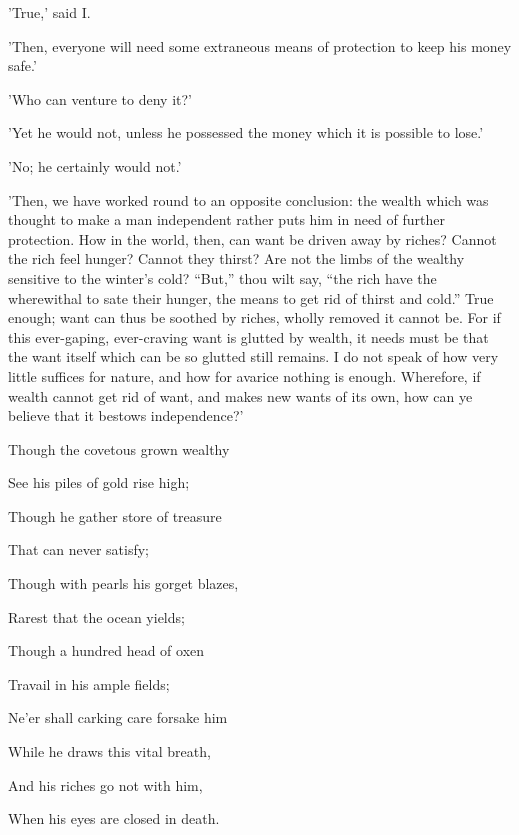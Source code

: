 'True,' said I.

'Then, everyone will need some extraneous means of protection to keep
his money safe.'

'Who can venture to deny it?'

'Yet he would not, unless he possessed the money which it is possible to
lose.'

'No; he certainly would not.'

'Then, we have worked round to an opposite conclusion: the wealth which
was thought to make a man independent rather puts him in need of further
protection. How in the world, then, can want be driven away by riches?
Cannot the rich feel hunger? Cannot they thirst? Are not the limbs of
the wealthy sensitive to the winter's cold? ``But,'' thou wilt say, ``the
rich have the wherewithal to sate their hunger, the means to get rid of
thirst and cold.'' True enough; want can thus be soothed by riches,
wholly removed it cannot be. For if this ever-gaping, ever-craving want
is glutted by wealth, it needs must be that the want itself which can be
so glutted still remains. I do not speak of how very little suffices for
nature, and how for avarice nothing is enough. Wherefore, if wealth
cannot get rid of want, and makes new wants of its own, how can ye
believe that it bestows independence?'


Though the covetous grown wealthy

See his piles of gold rise high;

Though he gather store of treasure

That can never satisfy;

Though with pearls his gorget blazes,

Rarest that the ocean yields;

Though a hundred head of oxen

Travail in his ample fields;

Ne'er shall carking care forsake him

While he draws this vital breath,

And his riches go not with him,

When his eyes are closed in death.


